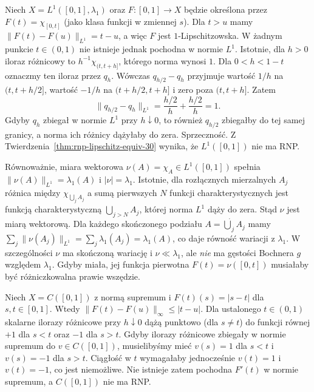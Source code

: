 \begin{przyklad}
\label{ex:L1-no-RNP-30}
Niech $X=L^1([0,1],\lambda_1)$ oraz
$F:[0,1]\to X$ będzie określona przez
$F(t)=\chi_{[0,t]}$ (jako klasa funkcji w zmiennej $s$).
Dla $t>u$ mamy $\|F(t)-F(u)\|_{L^1}=t-u$,
a więc $F$ jest $1$-Lipschitzowska.
W żadnym punkcie $t\in(0,1)$ nie istnieje jednak
pochodna w normie $L^1$. Istotnie, dla $h>0$
iloraz różnicowy to
$h^{-1}\chi_{(t,t+h]}$, którego norma wynosi $1$.
Dla $0<h<1-t$ oznaczmy ten iloraz przez $q_h$.
Wówczas $q_{h/2}-q_h$ przyjmuje wartość $1/h$
na $(t,t+h/2]$, wartość $-1/h$ na $(t+h/2,t+h]$
i zero poza $(t,t+h]$. Zatem
\[
 \|q_{h/2}-q_h\|_{L^1}
 =\frac{h/2}{h}+\frac{h/2}{h}=1.
\]
Gdyby $q_h$ zbiegał w normie $L^1$ przy $h\downarrow0$,
to również $q_{h/2}$ zbiegałby do tej samej granicy,
a norma ich różnicy dążyłaby do zera. Sprzeczność.
Z Twierdzenia~\ref{thm:rnp-lipschitz-equiv-30}
wynika, że $L^1([0,1])$ nie ma RNP.

Równoważnie, miara wektorowa
$\nu(A)=\chi_A\in L^1([0,1])$ spełnia
$\|\nu(A)\|_{L^1}=\lambda_1(A)$ i
$|\nu|=\lambda_1$. Istotnie, dla rozłącznych
mierzalnych $A_j$ różnica między $\chi_{\bigcup_j A_j}$
a sumą pierwszych $N$ funkcji charakterystycznych
jest funkcją charakterystyczną $\bigcup_{j>N}A_j$,
której norma $L^1$ dąży do zera. Stąd $\nu$ jest
miarą wektorową. Dla każdego skończonego podziału
$A=\dot\bigcup_j A_j$ mamy
$\sum_j\|\nu(A_j)\|_{L^1}=\sum_j\lambda_1(A_j)=\lambda_1(A)$,
co daje równość wariacji z $\lambda_1$.
W szczególności $\nu$ ma skończoną wariację
i $\nu\ll\lambda_1$, ale \emph{nie} ma gęstości
Bochnera $g$ względem $\lambda_1$.
Gdyby miała, jej funkcja pierwotna $F(t)=\nu([0,t])$
musiałaby być różniczkowalna prawie wszędzie.
\end{przyklad}

\begin{przyklad}
Niech $X=C([0,1])$ z normą supremum i
$F(t)(s)=|s-t|$ dla $s,t\in[0,1]$.
Wtedy $\|F(t)-F(u)\|_\infty\le|t-u|$.
Dla ustalonego $t\in(0,1)$ skalarne ilorazy różnicowe
przy $h\downarrow0$ dążą punktowo (dla $s\ne t$)
do funkcji równej $+1$ dla $s<t$ oraz $-1$ dla $s>t$.
Gdyby ilorazy różnicowe zbiegały w normie
supremum do $v\in C([0,1])$, musielibyśmy mieć
$v(s)=1$ dla $s<t$ i $v(s)=-1$ dla $s>t$.
Ciągłość w $t$ wymagałaby jednocześnie $v(t)=1$
i $v(t)=-1$, co jest niemożliwe.
Nie istnieje zatem pochodna $F'(t)$ w normie supremum,
a $C([0,1])$ nie ma RNP.
\end{przyklad}

